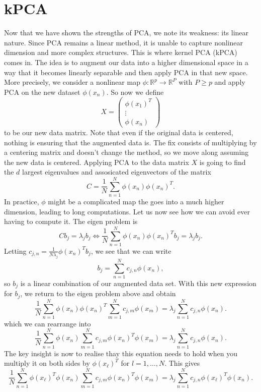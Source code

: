 \documentclass[12pt]{article}
\newcommand{\R}{\mathbb{R}}
\begin{document}
\section{kPCA} \label{sec: kPCA}
Now that we have shown the strengths of PCA, we note its weakness: its linear nature. Since PCA remains a linear method, it is unable to capture nonlinear dimension and more complex structures. This is where kernel PCA (kPCA) comes in. The idea is to augment our data into a higher dimensional space in a way that it becomes linearly separable and then apply PCA in that new space. More precisely, we consider a nonlinear map $\phi:\R^p \to \R^P$ with $P \ge p$ and apply PCA on the new dataset $\phi(x_n)$. So now we define 
\[
X = \begin{pmatrix}
    \phi(x_1)^T \\
    \vdots \\
    \phi(x_n)
\end{pmatrix}
\]
to be our new data matrix. Note that even if the original data is centered, nothing is ensuring that the augmented data is. The fix consists of multiplying by a centering matrix and doesn't change the method, so we move along assuming the new data is centered. Applying PCA to the data matrix $X$ is going to find the $d$ largest eigenvalues and assosicated eigenvectors of the matrix
\[
C = \frac{1}{N} \sum_{n = 1}^{N} \phi(x_n)\phi(x_n)^T.
\]
In practice, $\phi$ might be a complicated map the goes into a much higher dimension, leading to long computations. Let us now see how we can avoid ever having to compute it. The eigen problem is 
\[
C b_j = \lambda_j b_j \iff \frac{1}{N}\sum_{n = 1}^{N} \phi(x_n)\phi(x_n)^T b_j = \lambda_j b_j.
\]
Letting $c_{j,n} = \frac{1}{N\lambda_j}\phi(x_n)^T b_j$, we see that we can write 
\[
b_j = \sum_{n = 1}^{N} c_{j,n} \phi(x_n) ,
\]
so $b_j$ is a linear combination of our augmented data set. With this new expression for $b_j$, we return to the eigen problem above and obtain
\[
\frac{1}{N}\sum_{n = 1}^{N} \phi(x_n)\phi(x_n)^T \sum_{m = 1}^{N} c_{j,m} \phi(x_m) = \lambda_j \sum_{n = 1}^{N} c_{j,n} \phi(x_n).
\]
which we can rearrange into
\[
\frac{1}{N}\sum_{n = 1}^{N} \phi(x_n)\sum_{m = 1}^{N} c_{j,m} \phi(x_n)^T \phi(x_m) = \lambda_j \sum_{n = 1}^{N} c_{j,n} \phi(x_n).
\]
The key insight is now to realise thay this equation needs to hold when you multiply it on both sides by $\phi(x_\ell)^T$ for $l = 1, \dots, N$. This gives
\[
\frac{1}{N}\sum_{n = 1}^{N} \phi(x_\ell)^T\phi(x_n)\sum_{m = 1}^{N} c_{j,m} \phi(x_n)^T \phi(x_m) = \lambda_j \sum_{n = 1}^{N} c_{j,n} \phi(x_\ell)^T\phi(x_n).
\]
\end{document}

